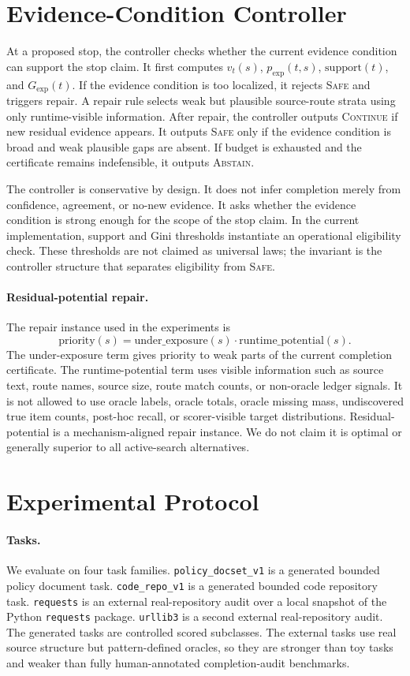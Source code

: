\documentclass[letterpaper,10pt,twocolumn]{article}
\newcommand{\safe}{\textsc{Safe}}
\newcommand{\cont}{\textsc{Continue}}
\newcommand{\abstain}{\textsc{Abstain}}
\newcommand{\pexp}{p_{\mathrm{exp}}}
\newcommand{\gexp}{G_{\mathrm{exp}}}
\newcommand{\sr}{\mathrm{support}}
\begin{document}
\section{Evidence-Condition Controller}

At a proposed stop, the controller checks whether the current evidence condition
can support the stop claim. It first computes \(v_t(s)\), \(\pexp(t,s)\),
\(\sr(t)\), and \(\gexp(t)\). If the evidence condition is too localized, it
rejects \safe{} and triggers repair. A repair rule selects weak but plausible
source-route strata using only runtime-visible information. After repair, the
controller outputs \cont{} if new residual evidence appears. It outputs \safe{}
only if the evidence condition is broad and weak plausible gaps are absent. If
budget is exhausted and the certificate remains indefensible, it outputs
\abstain{}.

The controller is conservative by design. It does not infer completion merely
from confidence, agreement, or no-new evidence. It asks whether the evidence
condition is strong enough for the scope of the stop claim. In the current
implementation, support and Gini thresholds instantiate an operational
eligibility check. These thresholds are not claimed as universal laws; the
invariant is the controller structure that separates eligibility from \safe{}.

\paragraph{Residual-potential repair.}
The repair instance used in the experiments is
\[
\mathrm{priority}(s)=\mathrm{under\_exposure}(s)\cdot
\mathrm{runtime\_potential}(s).
\]
The under-exposure term gives priority to weak parts of the current completion
certificate. The runtime-potential term uses visible information such as source
text, route names, source size, route match counts, or non-oracle ledger signals.
It is not allowed to use oracle labels, oracle totals, oracle missing mass,
undiscovered true item counts, post-hoc recall, or scorer-visible target
distributions. Residual-potential is a mechanism-aligned repair instance. We do
not claim it is optimal or generally superior to all active-search alternatives.

\section{Experimental Protocol}

\paragraph{Tasks.}
We evaluate on four task families. \texttt{policy\_docset\_v1} is a generated
bounded policy document task. \texttt{code\_repo\_v1} is a generated bounded code
repository task. \texttt{requests} is an external real-repository audit over a
local snapshot of the Python \texttt{requests} package. \texttt{urllib3} is a
second external real-repository audit. The generated tasks are controlled scored
subclasses. The external tasks use real source structure but pattern-defined
oracles, so they are stronger than toy tasks and weaker than fully
human-annotated completion-audit benchmarks.
\end{document}
